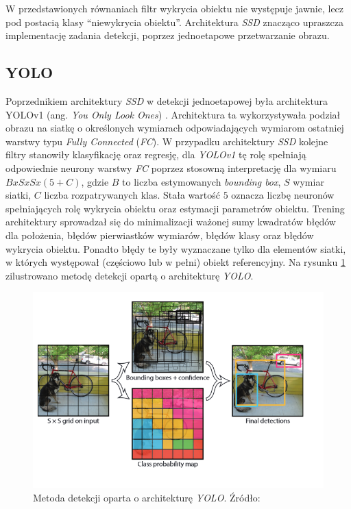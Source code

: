 W przedstawionych równaniach filtr wykrycia obiektu nie występuje jawnie, lecz pod postacią klasy ``niewykrycia obiektu''. 
Architektura \emph{SSD} znacząco upraszcza implementację zadania detekcji, poprzez jednoetapowe przetwarzanie obrazu. 


\subsection{YOLO}
\label{ch:yolo}
Poprzednikiem architektury \emph{SSD} w detekcji jednoetapowej była architektura YOLOv1 (ang. \emph{You Only Look Ones}) \cite{yolov1}.
Architektura ta wykorzystywała podział obrazu na siatkę o określonych wymiarach odpowiadających wymiarom ostatniej warstwy typu \emph{Fully Connected} (\emph{FC}).
W przypadku architektury \emph{SSD} kolejne filtry stanowiły klasyfikację oraz regresję, 
dla \emph{YOLOv1} tę rolę spełniają odpowiednie neurony warstwy \emph{FC} poprzez stosowną interpretację dla wymiaru $BxSxSx(5+C)$, gdzie $B$ to liczba estymowanych \emph{bounding box}, $S$ wymiar siatki, $C$ liczba rozpatrywanych klas. 
Stała wartość $5$ oznacza liczbę neuronów spełniających rolę wykrycia obiektu oraz estymacji parametrów obiektu.
Trening architektury sprowadzał się do minimalizacji ważonej sumy kwadratów błędów dla położenia, błędów pierwiastków wymiarów, błędów klasy oraz błędów wykrycia obiektu. 
Ponadto błędy te były wyznaczane tylko dla elementów siatki, w których występował (częściowo lub w pełni) obiekt referencyjny.
Na rysunku \ref{fig:yolo_img} zilustrowano metodę detekcji opartą o architekturę \emph{YOLO}.

\begin{figure}
    \centering
    \includegraphics[width=0.9\linewidth]{images/yolo.png}
    \caption{Metoda detekcji oparta o architekturę \emph{YOLO}. Źródło: \cite{yolov1}}
    \label{fig:yolo_img}
\end{figure}

